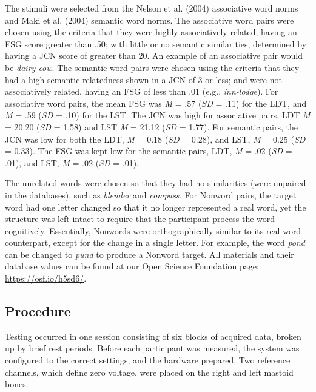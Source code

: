 \documentclass[english,man]{apa6}
\theoremstyle{definition}
\theoremstyle{definition}
\theoremstyle{definition}
\theoremstyle{remark}
\begin{document}
The stimuli were selected from the Nelson et al. (2004) associative word
norms and Maki et al. (2004) semantic word norms. The associative word
pairs were chosen using the criteria that they were highly associatively
related, having an FSG score greater than .50; with little or no
semantic similarities, determined by having a JCN score of greater than
20. An example of an associative pair would be \emph{dairy-cow}. The
semantic word pairs were chosen using the criteria that they had a high
semantic relatedness shown in a JCN of 3 or less; and were not
associatively related, having an FSG of less than .01 (e.g.,
\emph{inn-lodge}). For associative word pairs, the mean FSG was \emph{M}
= .57 (\emph{SD} = .11) for the LDT, and \emph{M} = .59 (\emph{SD} =
.10) for the LST. The JCN was high for associative pairs, LDT \emph{M} =
20.20 (\emph{SD} = 1.58) and LST \emph{M} = 21.12 (\emph{SD} = 1.77).
For semantic pairs, the JCN was low for both the LDT, \emph{M} = 0.18
(\emph{SD} = 0.28), and LST, \emph{M} = 0.25 (\emph{SD} = 0.33). The FSG
was kept low for the semantic pairs, LDT, \emph{M} = .02 (\emph{SD} =
.01), and LST, \emph{M} = .02 (\emph{SD} = .01).

The unrelated words were chosen so that they had no similarities (were
unpaired in the databases), such as \emph{blender} and \emph{compass.}
For Nonword pairs, the target word had one letter changed so that it no
longer represented a real word, yet the structure was left intact to
require that the participant process the word cognitively. Essentially,
Nonwords were orthographically similar to its real word counterpart,
except for the change in a single letter. For example, the word
\emph{pond} can be changed to \emph{pund} to produce a Nonword target.
All materials and their database values can be found at our Open Science
Foundation page: \url{https://osf.io/h5sd6/}.

\subsection{Procedure}\label{procedure}

Testing occurred in one session consisting of six blocks of acquired
data, broken up by brief rest periods. Before each participant was
measured, the system was configured to the correct settings, and the
hardware prepared. Two reference channels, which define zero voltage,
were placed on the right and left mastoid bones.
\end{document}
